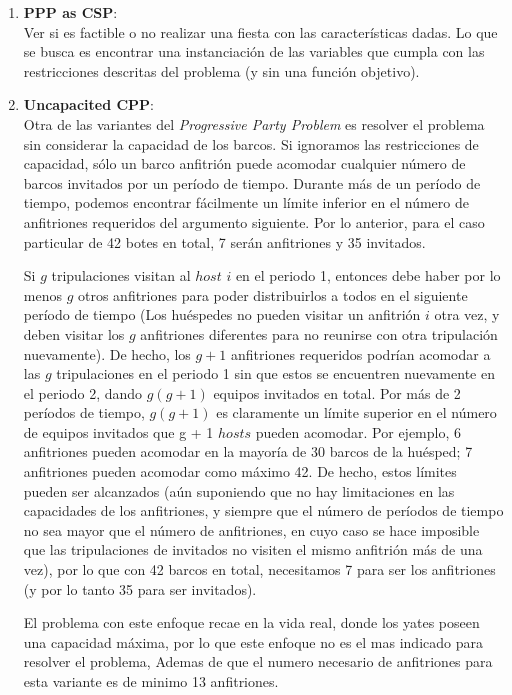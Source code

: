 \documentclass[letter, 10pt]{article}
\begin{document}
\begin{enumerate}
    \item \textbf{PPP as CSP}: \\
    Ver si es factible o no realizar una fiesta con las características dadas. Lo que se busca es encontrar una instanciación de las variables que cumpla con las restricciones descritas del problema (y sin una función objetivo). ~\cite{Brailsford:1996:OSE:241748.241755}
    
     \item \textbf{Uncapacited CPP}:\\
     Otra de las variantes del \textit{Progressive Party Problem} es resolver el problema sin considerar la capacidad de los barcos. Si ignoramos las restricciones de capacidad, sólo un barco anfitrión puede acomodar cualquier número de barcos invitados por un período de tiempo. Durante más de un período de tiempo, podemos encontrar fácilmente un límite inferior en el número de anfitriones requeridos del argumento siguiente. Por lo anterior, para el caso particular de 42 botes en total, 7 serán anfitriones y 35 invitados.
     
     Si $g$ tripulaciones visitan al $host$ $i$ en el periodo 1, entonces debe haber por lo menos $g$ otros anfitriones para poder distribuirlos a todos en el siguiente período de tiempo (Los huéspedes no pueden visitar un anfitrión $i$ otra vez, y deben visitar los $g$ anfitriones  diferentes para no reunirse con otra tripulación nuevamente). De hecho, los $g + 1$ anfitriones requeridos podrían acomodar a las $g$ tripulaciones en el periodo 1 sin que estos se encuentren nuevamente en el periodo 2, dando $g(g + 1)$ equipos invitados en total.
Por más de 2 períodos de tiempo, $g (g + 1)$ es claramente un límite superior en el número de equipos invitados que g + 1 $hosts$ pueden acomodar. Por ejemplo, 6 anfitriones pueden acomodar en la mayoría de 30 barcos de la huésped; 7 anfitriones pueden acomodar como máximo 42. De hecho, estos límites pueden ser alcanzados (aún suponiendo que no hay limitaciones en las capacidades de los anfitriones, y siempre que el número de períodos de tiempo no sea mayor que el número de anfitriones, en cuyo caso se hace imposible que las tripulaciones de invitados no visiten el mismo anfitrión más de una vez), por lo que con 42 barcos en total, necesitamos 7 para ser los anfitriones (y por lo tanto 35 para ser invitados).

     El problema con este enfoque recae en la vida real, donde los yates poseen una capacidad máxima, por lo que este enfoque no es el mas indicado para resolver el problema, Ademas de que el numero necesario de anfitriones para esta variante es de minimo 13 anfitriones. ~\cite{Smith1996}


\end{enumerate}
\end{document}
